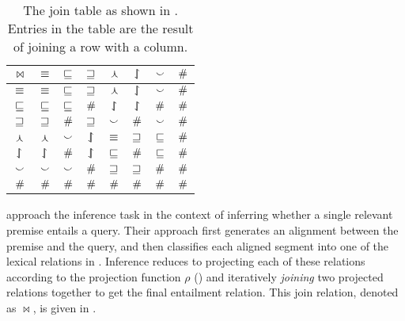 %
%

\begin{table}[t]
	\begin{center}
	\begin{tabular}{|c||c|c|c|c|c|c|c|}
    \hline
    $\bowtie$ & $\equiv$ & $\sqsubseteq$ & $\sqsupseteq$ & $\curlywedge$ & $\downharpoonleft\hspace{-1.25mm}\upharpoonright$ & $\smallsmile$ & $\#$ \\
    \hline
    $\equiv$ & $\equiv$ & $\sqsubseteq$ & $\sqsupseteq$ & $\curlywedge$ & $\downharpoonleft\hspace{-1.25mm}\upharpoonright$ & $\smallsmile$ & $\#$ \\
    $\sqsubseteq$ & $\sqsubseteq$ & $\sqsubseteq$ & $\#$ & $\downharpoonleft\hspace{-1.25mm}\upharpoonright$ & $\downharpoonleft\hspace{-1.25mm}\upharpoonright$ & $\#$ & $\#$ \\
    $\sqsupseteq$ & $\sqsupseteq$ & $\#$ & $\sqsupseteq$ & $\smallsmile$ & $\#$ & $\smallsmile$ & $\#$  \\
    $\curlywedge$ & $\curlywedge$ & $\smallsmile$ & $\downharpoonleft\hspace{-1.25mm}\upharpoonright$ & $\equiv$ & $\sqsupseteq$ & $\sqsubseteq$ & $\#$  \\
    $\downharpoonleft\hspace{-1.25mm}\upharpoonright$ & $\downharpoonleft\hspace{-1.25mm}\upharpoonright$ & $\#$ & $\downharpoonleft\hspace{-1.25mm}\upharpoonright$ & $\sqsubseteq$ & $\#$ & $\sqsubseteq$ & $\#$  \\
    $\smallsmile$ & $\smallsmile$ & $\smallsmile$ & $\#$ & $\sqsupseteq$ & $\sqsupseteq$ & $\#$ & $\#$  \\
    $\#$ & $\#$ & $\#$ & $\#$ & $\#$ & $\#$ & $\#$ & $\#$ \\
    \hline
	\end{tabular}
	\caption{
    The join table as shown in .
    Entries in the table are the result of joining a row with a
      column.
		\label{tab:join}
	}
	\end{center}
\end{table}

 approach the inference task in
  the context of inferring whether a single relevant premise entails
  a query.
Their approach first generates an alignment between the premise
  and the query, and then classifies each aligned segment into one of
  the lexical relations in .
Inference reduces to projecting each of these relations
  according to the projection function $\rho$ () 
  and iteratively \textit{joining}  two projected relations together to 
  get the final entailment relation.
This join relation, denoted as $\bowtie$, is given in .

